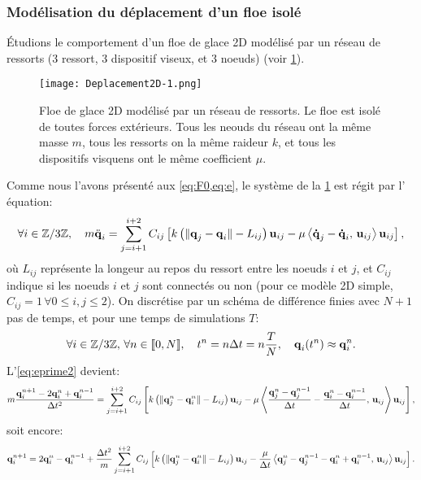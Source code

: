 \subsubsection{Modélisation du déplacement d'un floe isolé}

Étudions le comportement d'un floe de glace 2D modélisé par un réseau de ressorts (3 ressort, 3 dispositif viseux, et 3 noeuds) (voir \cref{fig:deplacement2d}).
\begin{figure}[!h]
    \centering
    \texttt{[image: Deplacement2D-1.png]}
    \caption{Floe de glace 2D modélisé par un réseau de ressorts. Le floe est isolé de toutes forces extérieurs. Tous les neouds du réseau ont la même masse $m$, tous les ressorts on la même raideur $k$, et tous les dispositifs visquens ont le même coefficient $\mu$.}
    \label{fig:deplacement2d}
\end{figure}


Comme nous l'avons présenté aux \cref{eq:F0,eq:e}, le système de la \cref{fig:deplacement2d} est régit par l' équation:
\begin{align} \label{eq:eprime2}
    \forall i \in \mathbb{Z}/3\mathbb{Z}, \quad m \ddot{\bm{\mathrm{q}}}_i = \sum_{j=i+1}^{i+2}C_{ij} \left[  k \left( \Vert \bm{\mathrm{q}}_j - \bm{\mathrm{q}}_i \Vert - L_{ij} \right) \bm{\mathrm{u}}_{ij} - \mu \left\langle \bm{\mathrm{\dot{q}}}_j - \bm{\mathrm{\dot{q}}}_i, \, \bm{\mathrm{u}}_{ij}  \right\rangle  \bm{\mathrm{u}}_{ij}  \right]  , 
\end{align}
où $L_{ij}$ représente la longeur au repos du ressort entre les noeuds $i$ et $j$, et $C_{ij}$ indique si les noeuds $i$ et $j$ sont connectés ou non (pour ce modèle 2D simple, $C_{ij} = 1 \, \forall 0 \leq i,j \leq 2$). On discrétise par un schéma de différence finies avec $N+1$ pas de temps, et pour une temps de simulations $T$:
$$
\forall i \in \mathbb{Z}/3\mathbb{Z}, \, \forall n \in [\![ 0,N ]\!], \quad  t^n = n\Delta t = n\frac{T}{N}, \quad \bm{\mathrm{q}}_i(t^n) \approx \bm{\mathrm{q}}_i^n.
$$
L'\cref{eq:eprime2} devient:
$$
m\frac{\bm{\mathrm{q}}_{i}^{n+1}-2\bm{\mathrm{q}}_{i}^{n}+\bm{\mathrm{q}}_{i}^{n-1}}{\Delta t^2} = \sum_{j=i+1}^{i+2}C_{ij}\left[ k \left( \Vert \bm{\mathrm{q}}_j^n - \bm{\mathrm{q}}_i^n \Vert - L_{ij} \right) \bm{\mathrm{u}}_{ij} - \mu \left\langle \frac{\bm{\mathrm{q}}_{j}^{n}-\bm{\mathrm{q}}_{j}^{n-1}}{\Delta t} - \frac{\bm{\mathrm{q}}_{i}^{n}-\bm{\mathrm{q}}_{i}^{n-1}}{\Delta t}, \, \bm{\mathrm{u}}_{ij} \right\rangle  \bm{\mathrm{u}}_{ij}  \right],
$$
soit encore:
\begin{align}
    \bm{\mathrm{q}}_{i}^{n+1} = 2\bm{\mathrm{q}}_{i}^{n}-\bm{\mathrm{q}}_{i}^{n-1} + \frac{\Delta t^2}{m} \sum_{j=i+1}^{i+2}C_{ij}\left[ k \left( \Vert \bm{\mathrm{q}}_j^n - \bm{\mathrm{q}}_i^n \Vert - L_{ij} \right) \bm{\mathrm{u}}_{ij} - \frac{\mu}{\Delta t} \left\langle \bm{\mathrm{q}}_{j}^{n}-\bm{\mathrm{q}}_{j}^{n-1} - \bm{\mathrm{q}}_{i}^{n}+\bm{\mathrm{q}}_{i}^{n-1}, \, \bm{\mathrm{u}}_{ij} \right\rangle  \bm{\mathrm{u}}_{ij}  \right].
\end{align}












